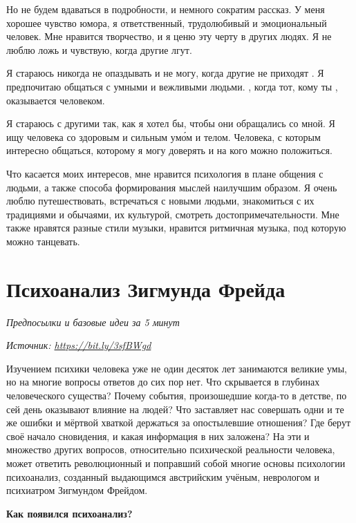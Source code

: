 Но не будем вдаваться в подробности, и немного сократим рассказ. У меня хорошее чувство юмора, я ответственный, трудолюбивый и эмоциональный человек. Мне нравится творчество, и я ценю эту черту в других людях. Я не люблю ложь и чувствую, когда другие лгут.

Я стараюсь никогда не опаздывать и  не могу, когда другие не приходят . Я предпочитаю общаться с умными и вежливыми людьми. , когда тот, кому ты , оказывается  человеком.

Я стараюсь  с другими так, как я хотел бы, чтобы они обращались со мной. Я ищу человека со здоровым и сильным ум\'{о}м и телом. Человека, с которым интересно общаться, которому я могу доверять и на кого можно положиться.

Что касается моих интересов, мне нравится психология в плане общения с людьми, а также способа формирования мыслей наилучшим образом. Я очень люблю путешествовать, встречаться с новыми людьми, знакомиться с их традициями и обычаями, их культурой, смотреть достопримечательности. Мне также нравятся разные стили музыки, нравится ритмичная музыка, под которую можно танцевать.


\section{Психоанализ Зигмунда Фрейда}

\textit{Предпосылки и базовые идеи за 5 минут}

\textit{Источник: \url{https://bit.ly/3sfBWgd}}

Изучением психики человека уже не один десяток лет занимаются великие умы, но на многие вопросы ответов до сих пор нет. Что скрывается в глубинах человеческого существа? Почему события, произошедшие когда-то в детстве, по сей день оказывают влияние на людей? Что заставляет нас совершать одни и те же ошибки и мёртвой хваткой держаться за опостылевшие отношения? Где берут своё начало сновидения, и какая информация в них заложена? На эти и множество других вопросов, относительно психической реальности человека, может ответить революционный и поправший собой многие основы психологии психоанализ, созданный выдающимся австрийским учёным, неврологом и психиатром Зигмундом Фрейдом.

\textbf{Как появился психоанализ?}

